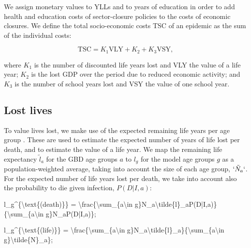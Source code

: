 \documentclass[
]{article}
\newenvironment{Shaded}{\begin{snugshade}}{\end{snugshade}}
\newcommand{\NormalTok}[1]{#1}
\begin{document}
We assign monetary values to YLLs and to years of education in order to add health and education costs of sector-closure policies to the costs of economic closures. We define the total socio-economic costs TSC of an epidemic as the sum of the individual costs:

\begin{equation}
\text{TSC} = K_1\text{VLY} + K_2 + K_3\text{VSY},
\label{eq:swf}
\end{equation}

where \(K_1\) is the number of discounted life years lost and VLY the value of a life year; \(K_2\) is the lost GDP over the period due to reduced economic activity; and \(K_3\) is the number of school years lost and VSY the value of one school year.

\subsection{Lost lives}\label{lost-lives}

To value lives lost, we make use of the expected remaining life years per age group \citep{GlobalBurdenofDiseaseCollaborativeNetwork2021}. These are used to estimate the expected number of years of life lost per death, and to estimate the value of a life year. We map the remaining life expectancy \(\tilde{l}_a\) for the GBD age groups \(a\) to \(l_g\) for the model age groups \(g\) as a population-weighted average, taking into account the size of each age group, \(`\tilde{N}_a`\). For the expected number of life years lost per death, we take into account also the probability to die given infection, \(P(D|I,a)\):

\begin{Shaded}
\begin{Highlighting}[]
\NormalTok{l\_g\^{}\{\textbackslash{}text\{(death)\}\} = \textbackslash{}frac\{\textbackslash{}sum\_\{a\textbackslash{}in g\}N\_a\textbackslash{}tilde\{l\}\_aP(D|I,a)\}\{\textbackslash{}sum\_\{a\textbackslash{}in g\}N\_aP(D|I,a)\}; }
\end{Highlighting}
\end{Shaded}

\begin{Shaded}
\begin{Highlighting}[]
\NormalTok{l\_g\^{}\{\textbackslash{}text\{(life)\}\} = \textbackslash{}frac\{\textbackslash{}sum\_\{a\textbackslash{}in g\}N\_a\textbackslash{}tilde\{l\}\_a\}\{\textbackslash{}sum\_\{a\textbackslash{}in g\}\textbackslash{}tilde\{N\}\_a\}; }
\end{Highlighting}
\end{Shaded}
\end{document}
